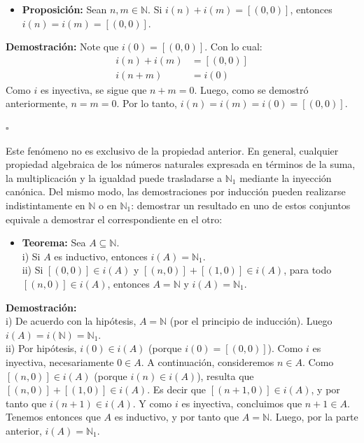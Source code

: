 \documentclass[10 pt]{article}
\begin{document}
\begin{itemize}
    \item \Large{\textbf{Proposición:} Sean $n,m \in \mathbb N$. Si $i(n)+i(m)=[(0,0)]$, entonces $i(n)=i(m)=[(0,0)]$.} \\
\end{itemize}

\Large{\textbf{Demostración:} Note que $i(0)=[(0,0)]$. Con lo cual:}
\begin{align*}
    i(n)+i(m)&=[(0,0)] \\
    i(n+m)&=i(0)
\end{align*}
\Large{Como $i$ es inyectiva, se sigue que $n+m=0$. Luego, como se demostró anteriormente, $n=m=0$. Por lo tanto, $i(n)=i(m)=i(0)=[(0,0)]$.} \\

\begin{flushright}
    $\square$
\end{flushright}

\Large{Este fenómeno no es exclusivo de la propiedad anterior. En general, cualquier propiedad algebraica de los números naturales expresada en términos de la suma, la multiplicación y la igualdad puede trasladarse a $\mathbb N_1$ mediante la inyección canónica. Del mismo modo, las demostraciones por inducción pueden realizarse indistintamente en $\mathbb N$ o en $\mathbb N_1$: demostrar un resultado en uno de estos conjuntos equivale a demostrar el correspondiente en el otro:} \\

\begin{itemize}
    \item \Large{\textbf{Teorema:} Sea $A \subseteq \mathbb N$. \\

    i) Si $A$ es inductivo, entonces $i(A)=\mathbb N_1$. \\

    ii) Si $[(0,0)] \in i(A)$ y $[(n,0)]+[(1,0)] \in i(A)$, para todo $[(n,0)] \in i(A)$, entonces $A=\mathbb N$ y $i(A)=\mathbb N_1$.} \\
\end{itemize}

\Large{\textbf{Demostración:} \\

i) De acuerdo con la hipótesis, $A=\mathbb N$ (por el principio de inducción). Luego $i(A)=i(\mathbb N)=\mathbb N_1$. \\

ii) Por hipótesis, $i(0) \in i(A)$ (porque $i(0)=[(0,0)]$). Como $i$ es inyectiva, necesariamente $0 \in A$. A continuación, consideremos $n \in A$. Como $[(n,0)] \in i(A)$ (porque $i(n) \in i(A)$), resulta que $[(n,0)]+[(1,0)] \in i(A)$. Es decir que $[(n+1,0)] \in i(A)$, y por tanto que $i(n+1) \in i(A)$. Y como $i$ es inyectiva, concluimos que $n+1 \in A$. Tenemos entonces que $A$ es inductivo, y por tanto que $A=\mathbb N$. Luego, por la parte anterior, $i(A)=\mathbb N_1$.} \\
\end{document}
